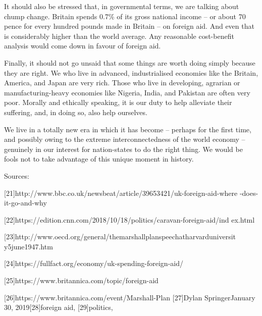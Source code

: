    It should also be stressed that, in governmental terms, we are talking
   about chump change. Britain spends 0.7\% of its gross national income --
   or about 70 pence for every hundred pounds made in Britain -- on
   foreign aid. And even that is considerably higher than the world
   average. Any reasonable cost-benefit analysis would come down in favour
   of foreign aid.

   Finally, it should not go unsaid that some things are worth doing
   simply because they are right. We who live in advanced, industrialised
   economies like the Britain, America, and Japan are very rich. Those who
   live in developing, agrarian or manufacturing-heavy economies like
   Nigeria, India, and Pakistan are often very poor. Morally and ethically
   speaking, it is our duty to help alleviate their suffering, and, in
   doing so, also help ourselves.

   We live in a totally new era in which it has become -- perhaps for the
   first time, and possibly owing to the extreme interconnectedness of the
   world economy -- genuinely in our interest for nation-states to do the
   right thing. We would be fools not to take advantage of this unique
   moment in history.

   Sources:

   [21]http://www.bbc.co.uk/newsbeat/article/39653421/uk-foreign-aid-where
   -does-it-go-and-why

   [22]https://edition.cnn.com/2018/10/18/politics/caravan-foreign-aid/ind
   ex.html

   [23]http://www.oecd.org/general/themarshallplanspeechatharvarduniversit
   y5june1947.htm

   [24]https://fullfact.org/economy/uk-spending-foreign-aid/

   [25]https://www.britannica.com/topic/foreign-aid

   [26]https://www.britannica.com/event/Marshall-Plan
   [27]Dylan SpringerJanuary 30, 2019[28]foreign aid, [29]politics,
